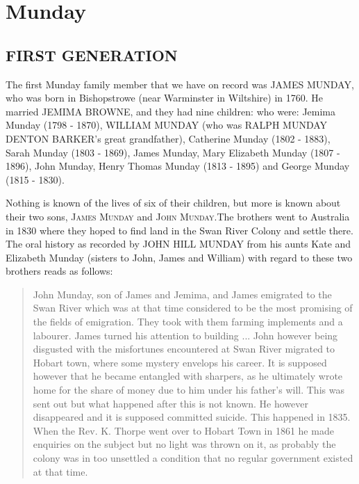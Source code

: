 \section{Munday}

\subsection{FIRST GENERATION}

The first Munday family member that we have on record was \uppercase{James Munday}, who was born in Bishopstrowe (near Warminster in Wiltshire) in 1760.  He  married \uppercase{Jemima Browne}, and they had nine children: who were: Jemima Munday (1798 - 1870), \uppercase{William Munday} (who was \uppercase{Ralph Munday Denton Barker}'s great grandfather),  Catherine Munday (1802 - 1883), Sarah Munday (1803 - 1869), James Munday, Mary Elizabeth Munday (1807 - 1896), John Munday, Henry Thomas Munday (1813 - 1895) and George Munday (1815 - 1830). 

Nothing is known of the lives of six of their children, but more is known about their two sons, \textsc{James Munday} and \textsc{John Munday}.The brothers went to Australia in 1830 where they hoped to find land in the Swan River Colony and settle there. 
The oral history as recorded by \uppercase{John Hill Munday} from his aunts Kate and Elizabeth Munday (sisters to John, James and William) with regard to these two brothers reads as follows: 

\begin{quotation}
John Munday, son of James and Jemima, and James emigrated to the Swan River which was at that time considered to be the most promising of the fields of emigration. They took with them farming implements and a labourer. James turned his attention to building ... John however being disgusted with the misfortunes encountered at Swan River migrated to Hobart town, where some mystery envelops his career. It is supposed however that he became entangled with sharpers, as he ultimately wrote home for the share of money due to him under his father's will. This was sent out but what happened after this is not known. He however disappeared and it is supposed committed suicide. This happened in 1835. When the Rev. K. Thorpe went over to Hobart Town in 1861 he made enquiries on the subject but no light was thrown on it, as probably the colony was in too unsettled a condition that no regular government existed at that time.
\end{quotation}


